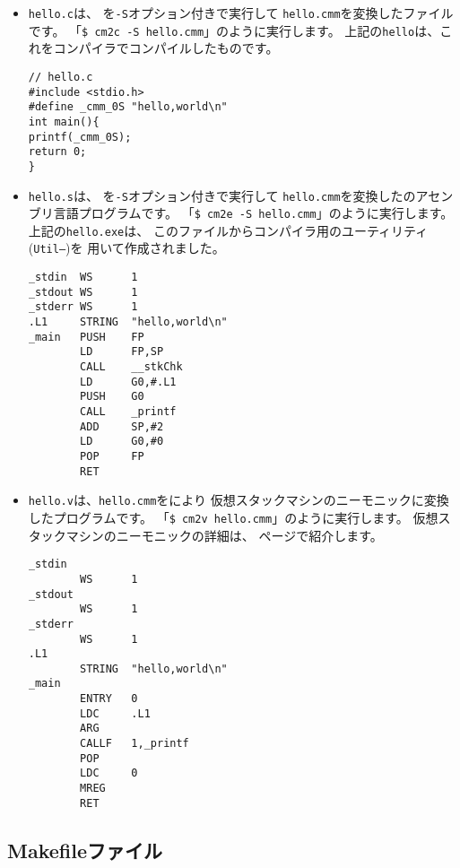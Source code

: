 \begin{itemize}

\item {\tt hello.c}は、
{\cmc}を{\tt -S}オプション付きで実行して
{\tt hello.cmm}を変換した{\cl}ファイルです。
「\verb/$ cm2c -S hello.cmm/」のように実行します。
上記の{\tt hello}は、これを{\cl}コンパイラでコンパイルしたものです。

\begin{mylist}
\begin{verbatim}
// hello.c
#include <stdio.h>
#define _cmm_0S "hello,world\n"
int main(){
printf(_cmm_0S);
return 0;
}
\end{verbatim}
\end{mylist}

\item {\tt hello.s}は、
{\cme}を{\tt -S}オプション付きで実行して
{\tt hello.cmm}を変換した{\tac}のアセンブリ言語プログラムです。
「\verb/$ cm2e -S hello.cmm/」のように実行します。
上記の{\tt hello.exe}は、
このファイルから{\cmm}コンパイラ用のユーティリティ({\tt Util--})を
用いて作成されました。

\begin{mylist}
\begin{verbatim}
_stdin  WS      1
_stdout WS      1
_stderr WS      1
.L1     STRING  "hello,world\n"
_main   PUSH    FP
        LD      FP,SP
        CALL    __stkChk
        LD      G0,#.L1
        PUSH    G0
        CALL    _printf
        ADD     SP,#2
        LD      G0,#0
        POP     FP
        RET
\end{verbatim}
\end{mylist}

\item {\tt hello.v}は、{\tt hello.cmm}を{\cmv}により
仮想スタックマシンのニーモニックに変換したプログラムです。
「\verb/$ cm2v hello.cmm/」のように実行します。
仮想スタックマシンのニーモニックの詳細は、
\pageref{app:vm}ページで紹介します。

\begin{mylist}
\begin{verbatim}
_stdin
        WS      1
_stdout
        WS      1
_stderr
        WS      1
.L1
        STRING  "hello,world\n"
_main
        ENTRY   0
        LDC     .L1
        ARG
        CALLF   1,_printf
        POP
        LDC     0
        MREG
        RET
\end{verbatim}
\end{mylist}
\end{itemize}

\subsection{Makefileファイル}

